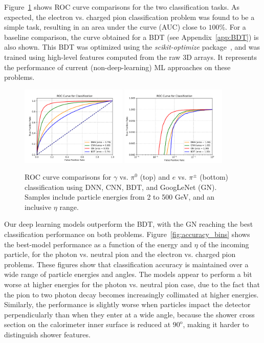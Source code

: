 Figure~\ref{fig:architectures_ROC_comparisons} shows ROC curve comparisons for the two classification tasks. As expected, the electron vs. charged pion classification problem was found to be a simple task, resulting in an area under the curve (AUC) close to $100\%$. For a baseline comparison, the curve obtained for a BDT (see Appendix~\ref{app:BDT}) is also shown. This BDT was optimized using the {\it scikit-optimize} package~\cite{skopt}, and was trained using high-level features computed from the raw 3D arrays. It represents the performance of current (non-deep-learning) ML approaches on these problems.

\begin{figure}[htbp]
\centering
\includegraphics[width=0.45\textwidth]{Images/Calo/architectures_ROC_comparison_gamma_pi0_long.pdf}
\includegraphics[width=0.45\textwidth]{Images/Calo/architectures_ROC_comparison_ele_chpi_xlog.pdf}
\caption{ROC curve comparisons for $\gamma$ vs. $\pi^0$ (top) and $e$ vs. $\pi^\pm$ (bottom) classification using DNN, CNN, BDT, and GoogLeNet (GN). Samples include particle energies from 2 to 500 GeV, and an inclusive $\eta$ range.}
\label{fig:architectures_ROC_comparisons}
\end{figure}

Our deep learning models outperform the BDT, with the GN reaching the best classification performance on both problems. Figure~\ref{fig:accuracy_bins} shows the best-model performance as a function of the energy and $\eta$ of the incoming particle, for the photon vs. neutral pion and the electron vs. charged pion problems. These figures show that classification accuracy is maintained over a wide range of particle energies and angles. The models appear to perform a bit worse at higher energies for the photon vs. neutral pion case, due to the fact that the pion to two photon decay becomes increasingly collimated at higher energies. Similarly, the performance is slightly worse when particles impact the detector perpendicularly than when they enter at a wide angle, because the shower cross section on the calorimeter inner surface is reduced at $90^{\mathrm o}$, making it harder to distinguish shower features.


